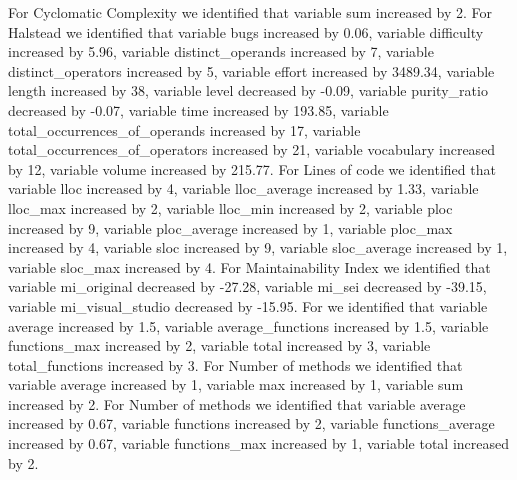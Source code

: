 For Cyclomatic Complexity we identified that variable sum increased by 2.
For Halstead we identified that variable bugs increased by 0.06, variable difficulty increased by 5.96, variable distinct\_operands increased by 7, variable distinct\_operators increased by 5, variable effort increased by 3489.34, variable length increased by 38, variable level decreased by -0.09, variable purity\_ratio decreased by -0.07, variable time increased by 193.85, variable total\_occurrences\_of\_operands increased by 17, variable total\_occurrences\_of\_operators increased by 21, variable vocabulary increased by 12, variable volume increased by 215.77.
For Lines of code we identified that variable lloc increased by 4, variable lloc\_average increased by 1.33, variable lloc\_max increased by 2, variable lloc\_min increased by 2, variable ploc increased by 9, variable ploc\_average increased by 1, variable ploc\_max increased by 4, variable sloc increased by 9, variable sloc\_average increased by 1, variable sloc\_max increased by 4.
For Maintainability Index we identified that variable mi\_original decreased by -27.28, variable mi\_sei decreased by -39.15, variable mi\_visual\_studio decreased by -15.95.
For  we identified that variable average increased by 1.5, variable average\_functions increased by 1.5, variable functions\_max increased by 2, variable total increased by 3, variable total\_functions increased by 3.
For Number of methods we identified that variable average increased by 1, variable max increased by 1, variable sum increased by 2.
For Number of methods we identified that variable average increased by 0.67, variable functions increased by 2, variable functions\_average increased by 0.67, variable functions\_max increased by 1, variable total increased by 2.

